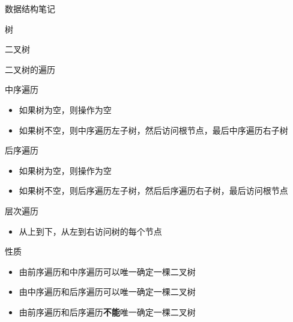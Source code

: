 \documentclass[
  ignorenonframetext,
]{beamer}
\providecommand{\tightlist}{%
  \setlength{\itemsep}{0pt}\setlength{\parskip}{0pt}}
\begin{document}
\begin{frame}[fragile]{数据结构笔记}
\begin{block}{树}
\begin{block}{二叉树}
\begin{block}{二叉树的遍历}
\begin{block}{中序遍历}
\protect{}\label{ux4e2dux5e8fux904dux5386}
\begin{itemize}
\tightlist
\item
  如果树为空，则操作为空
\item
  如果树不空，则中序遍历左子树，然后访问根节点，最后中序遍历右子树
\end{itemize}
\end{block}

\begin{block}{后序遍历}
\protect{}\label{ux540eux5e8fux904dux5386}
\begin{itemize}
\tightlist
\item
  如果树为空，则操作为空
\item
  如果树不空，则后序遍历左子树，然后后序遍历右子树，最后访问根节点
\end{itemize}
\end{block}

\begin{block}{层次遍历}
\protect{}\label{ux5c42ux6b21ux904dux5386}
\begin{itemize}
\tightlist
\item
  从上到下，从左到右访问树的每个节点
\end{itemize}
\end{block}

\begin{block}{性质}
\protect{}\label{ux6027ux8d28}
\begin{itemize}
\tightlist
\item
  由前序遍历和中序遍历可以唯一确定一棵二叉树
\item
  由中序遍历和后序遍历可以唯一确定一棵二叉树
\item
  由前序遍历和后序遍历\textbf{不能}唯一确定一棵二叉树
\end{itemize}
\end{block}
\end{block}


\end{block}
\end{block}
\end{frame}
\end{document}
